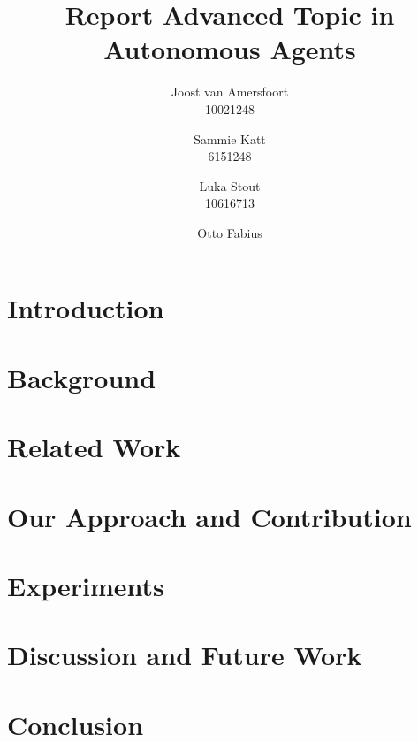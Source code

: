 \documentclass{article}
\title{Report Advanced Topic in Autonomous Agents}
\author{Joost van Amersfoort \\ 10021248 \and Sammie Katt \\ 6151248 \and Luka Stout \\ 10616713 \and Otto Fabius}
\begin{document}
\maketitle
\tableofcontents
\newpage

\section{Introduction}


\section{Background}


\section{Related Work}


\section{Our Approach and Contribution}


\section{Experiments}


\section{Discussion and Future Work}


\section{Conclusion}

\end{document}
